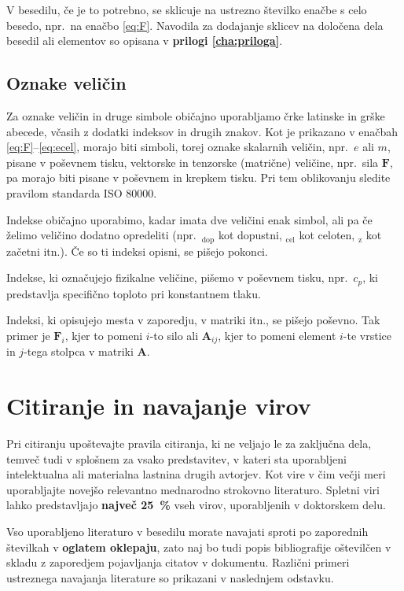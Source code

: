V besedilu, če je to potrebno, se sklicuje na ustrezno številko enačbe s celo besedo, npr.~na enačbo \eqref{eq:F}. Navodila za dodajanje sklicev na določena dela besedil ali elementov so opisana v \textbf{prilogi \ref{cha:priloga}}.

\subsection{Oznake veličin}\label{sec:oznake_velicin}
Za oznake veličin in druge simbole običajno uporabljamo črke latinske in grške abecede, včasih z dodatki indeksov in drugih znakov. Kot je prikazano v enačbah \eqref{eq:F}--\eqref{eq:ecel}, morajo biti simboli, torej oznake skalarnih veličin, npr.~$e$ ali $m$, pisane v poševnem tisku, vektorske in tenzorske (matrične) veličine, npr.~sila $\bm{F}$, pa morajo biti pisane v poševnem in krepkem tisku. Pri tem oblikovanju sledite pravilom standarda ISO 80000.

Indekse običajno uporabimo, kadar imata dve veličini enak simbol, ali pa če želimo veličino dodatno opredeliti (npr.~$_\mathrm{dop}$ kot dopustni, $_\mathrm{cel}$ kot celoten, $_\mathrm{z}$ kot začetni itn.). Če so ti indeksi opisni, se pišejo pokonci.

Indekse, ki označujejo fizikalne veličine, pišemo v poševnem tisku, npr.~$c_p$, ki predstavlja specifično toploto pri konstantnem tlaku.

Indeksi, ki opisujejo mesta v zaporedju, v matriki itn., se pišejo poševno. Tak primer je $\bm{F}_i$, kjer to pomeni $i$-to silo ali $\bm{A}_{ij}$, kjer to pomeni element $i$-te vrstice in $j$-tega stolpca v matriki $\bm{A}$.


\section{Citiranje in navajanje virov}\label{sec:citiranje}
Pri citiranju upoštevajte pravila citiranja, ki ne veljajo le za zaključna dela, temveč tudi v splošnem za vsako predstavitev, v kateri sta uporabljeni intelektualna ali materialna lastnina drugih avtorjev. Kot vire v čim večji meri uporabljajte novejšo relevantno mednarodno strokovno literaturo. Spletni viri lahko predstavljajo \textbf{največ 25~\%} vseh virov, uporabljenih v doktorskem delu.

Vso uporabljeno literaturo v besedilu morate navajati sproti po zaporednih številkah v \textbf{oglatem oklepaju}, zato naj bo tudi popis bibliografije oštevilčen v skladu z zaporedjem pojavljanja citatov v dokumentu. Različni primeri ustreznega navajanja literature so prikazani v naslednjem odstavku.

